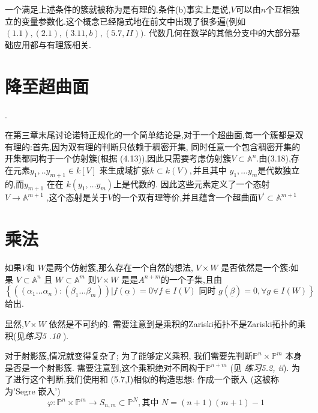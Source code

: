 \documentclass[UTF8]{book}
\begin{document}
		
		一个满足上述条件的簇就被称为是有理的.条件(b)事实上是说,$V$可以由$n$个互相独立的变量参数化.这个概念已经隐式地在前文中出现了很多遍(例如 $(1.1), (2.1), (3.11, b), (5.7,II)) .$ 代数几何在数学的其他分支中的大部分基础应用都与有理簇相关.
		
		
	\section{降至超曲面}. 
	
		在第三章末尾讨论诺特正规化的一个简单结论是,对于一个超曲面,每一个簇都是双有理的:首先,因为双有理的判断只依赖于稠密开集, 同时任意一个包含稠密开集的开集都同构于一个仿射簇(根据 (4.13)),因此只需要考虑仿射簇$V \subset \mathbb{A} ^{ n }$.由(3.18),存在元素$y_{1}, . . y_{m+1} \in k [ V ]$ 来生成域扩张$k \subset k ( V ),$并且其中 $y _{1}, \dots y _{ m }$是代数独立的,而$y _{ m +1}$ 在在 $k \left( y _{1}, \dots y _{ m }\right) $上是代数的. 因此这些元素定义了一个态射 $V \rightarrow \mathbb{A} ^{ m +1}$
		,这个态射是关于$V$的一个双有理等价,并且蕴含一个超曲面$V ^{\prime} \subset \mathbb{A} ^{ m +1}$
		
		
	\section{乘法} 
	
	
		如果$V$和 $W$是两个仿射簇,那么存在一个自然的想法, $V \times W$ 是否依然是一个簇:如果 $V \subset \mathbb{A} ^{ n }$ 且 $W \subset \mathbb{A} ^{ m }$ 则$V \times W$ 是是$A ^{ n + m }$的一个子集,且由
		\begin{equation*}
		\left\{\left(\left(\alpha_{1} \ldots \alpha_{n}\right):\left(\beta_{1} \ldots \beta_{m}\right)\right) | f(\underline{\alpha})=0 \forall f \in I(V) \text { 同时 } g(\underline{\beta})=0 ,\forall g \in I(W)\right\}
		\end{equation*}
		给出.
		
		
		显然,$V \times W$ 依然是不可约的. 需要注意到是乘积的Zariski拓扑不是Zariski拓扑的乘积(见\textit{练习5 .10 }). 
		
		
		对于射影簇,情况就变得复杂了; 为了能够定义乘积, 我们需要先判断$\mathbb{P} ^{n} \times \mathbb{P} ^{m}$ 本身是否是一个射影簇. 需要注意到,这个乘积绝对不同构于$\mathbb{P} ^{ n + m }$ (见 \textit{练习5.2, ii}). 为了进行这个判断,我们使用和 (5.7,I)相似的构造思想: 作成一个嵌入 (这被称为'Segre 嵌入')
		\begin{equation*}
		\varphi: \mathbb{P} ^{n} \times \mathbb{P} ^{m} \rightarrow S_{n, m} \subset \mathbb{P}^{ N}, \text {其中 } N=(n+1)(m+1)-1
		\end{equation*}
		
\end{document}

